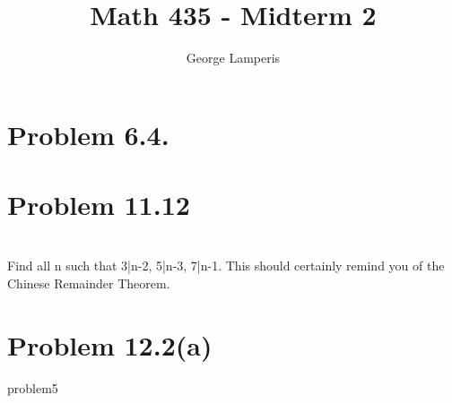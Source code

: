 \documentclass[letterpaper, 12pt, oneside]{memoir}
\title{Math 435 - Midterm 2}
\author{George Lamperis}
\date{}
\theoremstyle{mystyle}
\begin{document}
\maketitle

\section{Problem 6.4.}


\section{} 


\section{Problem 11.12} 


\section{} 
Find all n such that  3|n-2, 5|n-3, 7|n-1. This should certainly remind you of the Chinese Remainder Theorem. 

\section{Problem 12.2(a)} 
 {problem5}

\section{} 

\end{document}

